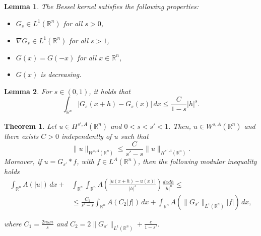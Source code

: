 \documentclass[10pt,a4paper]{amsart}
\newtheorem{lemma}{Lemma}
\newtheorem{theorem}{Theorem}
\newcommand{\R}{\mathbb R}
\begin{document}
\begin{lemma} \label{lema.G}
The Bessel kernel satisfies the following properties:
\begin{itemize}
\item[i)] $G_s\in L^1(\mathbb{R}^n)$ for all $s>0$,
\item[ii)] $\nabla G_s\in L^1(\mathbb{R}^n)$ for all $s>1$,
\item[iii)] $G(x) = G(-x)$ for all $x\in \R^n$,
\item[iv)] $G(x)$ is decreasing.
\end{itemize}
\end{lemma}

\begin{lemma} \label{lema.2}
For $s\in(0,1)$, it holds that
$$
\int_{\R^n} |G_s(x+h)-G_s(x)|\,dx \leq \frac{C}{1-s} |h|^s.
$$
\end{lemma}

\begin{theorem} \label{teo.s1}
Let $u\in H^{s',A}(\R^n)$ and $0<s<s'<1$. Then, $u\in W^{s, A}(\R^n)$ and there exists $C>0$ independently of $u$ such that
$$
\|u\|_{W^{s,A}(\R^n)} \leq \frac{C}{s'-s} \|u\|_{H^{s',A}(\R^n)}.
$$
Moreover, if $u=G_{s'}* f$, with $f\in L^A(\R^n)$, then the following modular inequality holds
\begin{align*}
\int_{\R^n} A(|u|)\,dx +&\int_{\R^n}\int_{\R^n}  A\left(\frac{|u(x+h)-u(x)|}{|h|^s}\right)\frac{dxdh}{|h|^n}\leq \\
&\leq  \frac{C_1}{s'-s} \int_{\R^n} A(C_2|f|)\,dx +  \int_{\R^n} A(\|G_{s'}\|_{L^1(\R^n)}|f|)\,dx,
\end{align*}

where $C_1=\frac{2n\omega n}{s}$ and $C_2=2\|G_{s'}\|_{L^1(\R^n)} + \frac{c}{1-s'}$.
\end{theorem}
\end{document}
